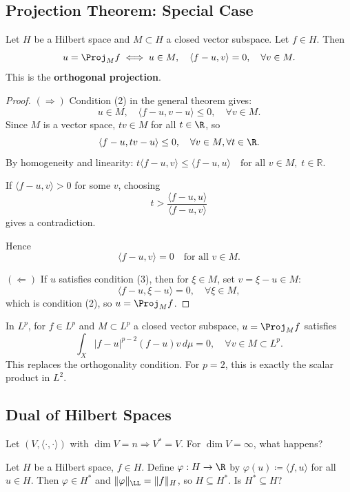 \subsection{Projection Theorem: Special Case}

\begin{corollary}
Let $H$ be a Hilbert space and $M \subset H$ a closed vector subspace. Let $f \in H$. Then
\[
u = \Proj_M f \iff u \in M, \quad \langle f - u, v \rangle = 0, \quad \forall v \in M.
\]
This is the \textbf{orthogonal projection}.
\end{corollary}

\begin{proof}
$(\Rightarrow)$ Condition (2) in the general theorem gives:
\[
u \in M, \quad \langle f - u, v - u \rangle \leq 0, \quad \forall v \in M.
\]
Since $M$ is a vector space, $tv \in M$ for all $t \in \R$, so
\[
\langle f - u, tv - u \rangle \leq 0, \quad \forall v \in M, \forall t \in \R.
\]
By homogeneity and linearity: $
t \langle f - u, v \rangle \leq \langle f - u, u \rangle \quad \text{for all } v \in M, \; t \in \mathbb{R}.
$

If $\langle f - u, v \rangle > 0$ for some $v$, choosing 
\[
t > \frac{\langle f - u, u \rangle}{\langle f - u, v \rangle}
\]
gives a contradiction.

Hence
\[
\langle f - u, v \rangle = 0 \quad \text{for all } v \in M.
\]


$(\Leftarrow)$ If $u$ satisfies condition (3), then for $\xi \in M$, set $v = \xi - u \in M$:
\[
\langle f - u, \xi - u \rangle = 0, \quad \forall \xi \in M,
\]
which is condition (2), so $u = \Proj_M f$.
\end{proof}

\begin{remark}
In $L^p$, for $f \in L^p$ and $M \subset L^p$ a closed vector subspace, $u = \Proj_M f$ satisfies
\[
\int_X |f - u|^{p-2} (f - u) v \, d\mu = 0, \quad \forall v \in M \subset L^p.
\]
This replaces the orthogonality condition. For $p = 2$, this is exactly the scalar product in $L^2$.
\end{remark}

\clearpage
\subsection{Dual of Hilbert Spaces}

Let $(V, \langle \cdot, \cdot \rangle)$ with $\dim V = n \Rightarrow V^* = V$. For $\dim V = \infty$, what happens?

Let $H$ be a Hilbert space, $f \in H$. Define $\varphi: H \to \R$ by $\varphi(u) \coloneqq \langle f, u \rangle$ for all $u \in H$. Then $\varphi \in H^*$ and $\|\varphi\|_\LL = \|f\|_H$, so $H \subseteq H^*$. Is $H^* \subseteq H$?

